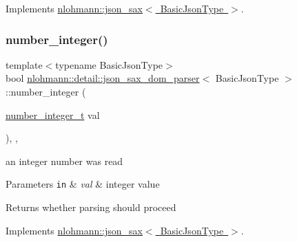 Implements \mbox{\hyperlink{structnlohmann_1_1json__sax_ae7c31614e8a82164d2d7f8dbf4671b25}{nlohmann\+::json\+\_\+sax$<$ Basic\+Json\+Type $>$}}.

\mbox{\label{classnlohmann_1_1detail_1_1json__sax__dom__parser_a835f34811b941c9d9d90b8960b50ed36}} 
\subsubsection{\texorpdfstring{number\+\_\+integer()}{number\_integer()}}
{\footnotesize\ttfamily template$<$typename Basic\+Json\+Type$>$ \\
bool \mbox{\hyperlink{classnlohmann_1_1detail_1_1json__sax__dom__parser}{nlohmann\+::detail\+::json\+\_\+sax\+\_\+dom\+\_\+parser}}$<$ Basic\+Json\+Type $>$\+::number\+\_\+integer (\begin{DoxyParamCaption}\item[{\mbox{\hyperlink{structnlohmann_1_1json__sax_a0cef30121f02b7fee85e9708148ea0aa}{number\+\_\+integer\+\_\+t}}}]{val }\end{DoxyParamCaption})\hspace{0.3cm}{\ttfamily [inline]}, {\ttfamily [override]}, {\ttfamily [virtual]}}



an integer number was read 


\begin{DoxyParams}[1]{Parameters}
\mbox{\tt in}  & {\em val} & integer value \\
\hline
\end{DoxyParams}
\begin{DoxyReturn}{Returns}
whether parsing should proceed 
\end{DoxyReturn}


Implements \mbox{\hyperlink{structnlohmann_1_1json__sax_affa7a78b8e9cc9cc3ac99927143142a5}{nlohmann\+::json\+\_\+sax$<$ Basic\+Json\+Type $>$}}.

\mbox{\label{classnlohmann_1_1detail_1_1json__sax__dom__parser_a5140b219d7e4c291ca24d7d736798062}} 
